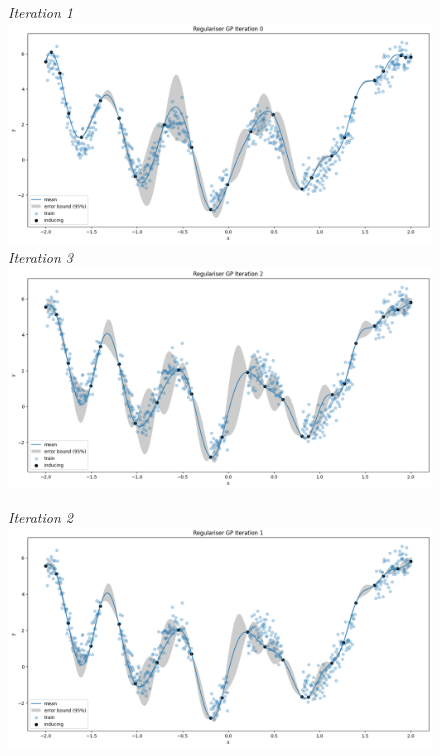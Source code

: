 \documentclass{article}
\numberwithin{equation}{section}
\begin{document}
\begin{figure}[h!]
\small
\centering
\begin{minipage}{.5\textwidth}
  \centering
  \textit{Iteration 1}
  \includegraphics[width=\linewidth, trim={0 0 0 0.77cm},clip]{thesis_report/figures/inducing_points_kernel/iteration-0/prediction.png} 
  \textit{Iteration 3}
  \includegraphics[width=\linewidth, trim={0 0 0 0.77cm},clip]{thesis_report/figures/inducing_points_kernel/iteration-2/prediction.png}
\end{minipage}%
\begin{minipage}{.5\textwidth}
  \centering
  \textit{Iteration 2}
  \includegraphics[width=\linewidth, trim={0 0 0 0.77cm},clip]{thesis_report/figures/inducing_points_kernel/iteration-1/prediction.png}

\end{minipage}
\end{figure}
\end{document}
